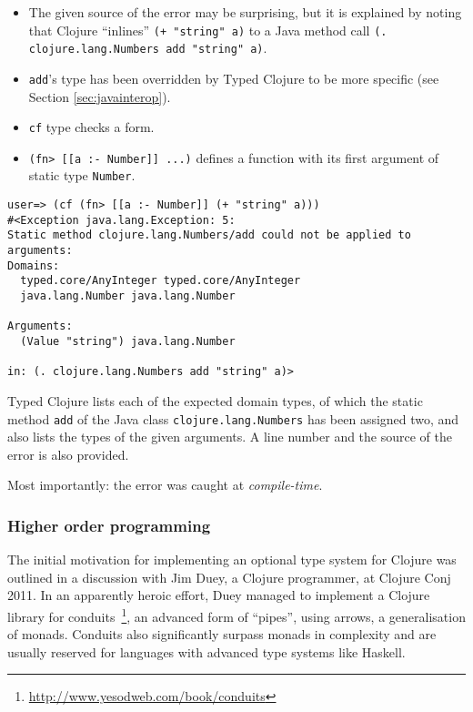 \begin{itemize}
  \item The given source of the error may be surprising, but it is explained
        by noting that Clojure ``inlines'' \lstinline|(+ "string" a)| to a Java method call
        \lstinline|(. clojure.lang.Numbers add "string" a)|.
  \item \lstinline|add|'s type has been overridden by Typed Clojure to be more specific (see Section \ref{sec:javainterop}).
  \item \lstinline|cf| type checks a form.
  \item \lstinline|(fn> [[a :- Number]] ...)| defines a function with its first argument of static type \lstinline|Number|.
\end{itemize}

\begin{lstlisting}[caption=Compile-time errors in Typed Clojure, label=lst:tcctime]
user=> (cf (fn> [[a :- Number]] (+ "string" a)))
#<Exception java.lang.Exception: 5: 
Static method clojure.lang.Numbers/add could not be applied to arguments:
Domains: 
  typed.core/AnyInteger typed.core/AnyInteger
  java.lang.Number java.lang.Number

Arguments:
  (Value "string") java.lang.Number

in: (. clojure.lang.Numbers add "string" a)>
\end{lstlisting}

Typed Clojure lists each of the expected domain types, of which the static method \lstinline|add| of the Java class
\lstinline|clojure.lang.Numbers| has been assigned two,
and also lists the types of the given arguments.
A line number and the source of the error is also provided.

Most importantly: the error was caught at \emph{compile-time}.

\subsubsection{Higher order programming}

The initial motivation for implementing an optional type system
for Clojure was outlined in a discussion with Jim Duey, a Clojure programmer, at Clojure Conj 2011.
In an apparently heroic effort, Duey managed to
implement a Clojure library for conduits~\footnote{\url{http://www.yesodweb.com/book/conduits}}, 
an advanced form of ``pipes'', using arrows, a generalisation of monads.
Conduits also significantly surpass monads in complexity and are usually reserved
for languages with advanced type systems like Haskell.

